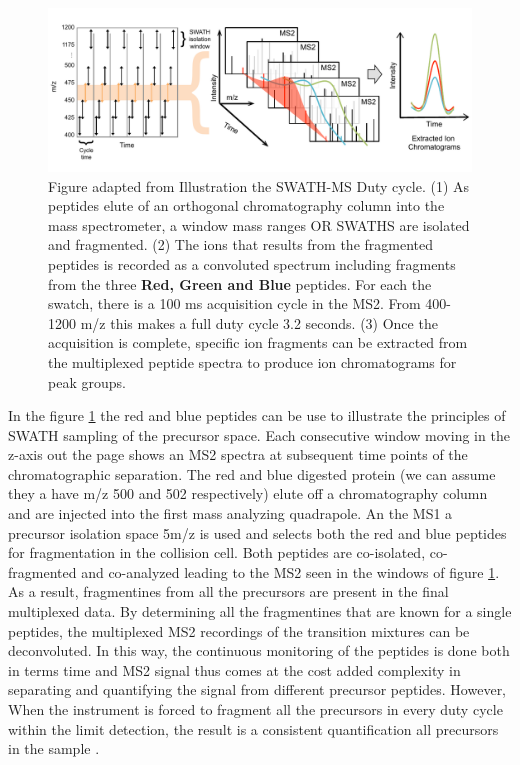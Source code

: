 \documentclass[a4paper,11pt,twoside]{book}
\begin{document}
	\begin{figure}[!htb]
		\centering
		\includegraphics[width=1.0\linewidth]{3.Proteomics/XIC.pdf}
		\caption{ Figure adapted from \citep{Rost2017AutomatedChromatograms} Illustration the SWATH-MS Duty cycle. (1) As peptides elute of an orthogonal chromatography column into the mass spectrometer, a window mass ranges OR SWATHS are isolated and fragmented. (2) The ions that results from the fragmented peptides is recorded as a convoluted spectrum including fragments from the three \textbf{Red, Green and Blue} peptides. For each the swatch, there is a 100 ms acquisition cycle in the MS2. From 400-1200 m/z this makes a full duty cycle 3.2 seconds. (3) Once the acquisition is complete, specific ion fragments can be extracted from the multiplexed peptide spectra to produce ion chromatograms for peak groups. }
		\label{fig:Principles SWATH MS}
	\end{figure}
	
	In the figure \ref{fig:Principles SWATH MS} the red and blue peptides can be use to illustrate the principles of  SWATH sampling of the precursor space. Each consecutive window moving in the z-axis out the page shows an MS2 spectra at subsequent time points of the chromatographic separation. The red and blue digested protein (we can assume they a have m/z 500 and 502 respectively) elute off a chromatography column and are injected into the first mass analyzing quadrapole. An the MS1 a precursor isolation space 5m/z is used and selects both the red and blue peptides for fragmentation in the collision cell. Both peptides are co-isolated, co-fragmented and co-analyzed leading to the MS2 seen in the windows of figure \ref{fig:Principles SWATH MS}. As a result, fragmentines from all the precursors are present in the final multiplexed data. By determining all the fragmentines that are known for a single peptides, the multiplexed MS2 recordings of the transition mixtures can be deconvoluted. 	In this way, the continuous monitoring of the peptides is done both in terms time and MS2 signal thus comes at the cost added complexity in separating and quantifying the signal from different precursor peptides. However, When the instrument is forced to fragment all the precursors in every duty cycle within the limit detection, the result is a consistent quantification all precursors in the sample \citep{Gillet2012TargetedAnalysis}. 
	
\end{document}
